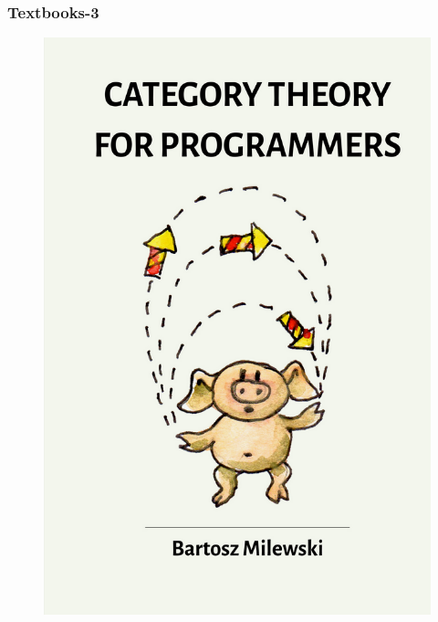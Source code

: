 \begin{frame}
\frametitle{Textbooks-3}

\begin{figure}[ht]
	\begin{minipage}[c][1\width]{
			0.3\textwidth}
		\centering
		\includegraphics[width=\linewidth]{./Figures/chapter-00/category_theory.png}
	\end{minipage}
	\hfill	
	\begin{minipage}[c][1\width]{
			0.3\textwidth}
		\centering

\end{minipage}
\end{figure}
\end{frame}
